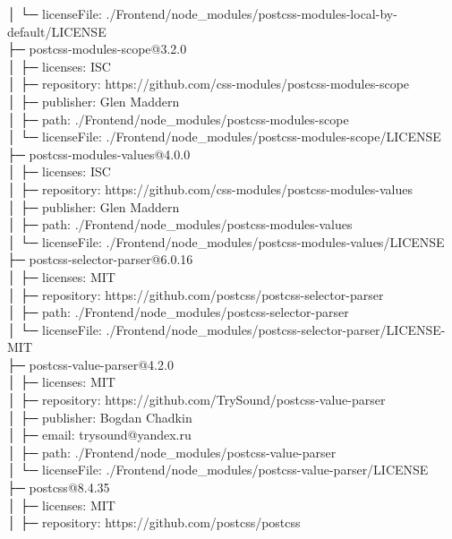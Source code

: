 \documentclass[
    paper=a4,
    twoside=false,
    parskip=half,
    listof=entryprefix,
    listof=totoc,
    index=totoc,
    bibliography=totoc,
    headsepline,
]{scrbook}
\begin{document}
    │  └─ licenseFile: ./Frontend/node\_modules/postcss-modules-local-by-default/LICENSE\\
    ├─ postcss-modules-scope@3.2.0\\
    │  ├─ licenses: ISC\\
    │  ├─ repository: https://github.com/css-modules/postcss-modules-scope\\
    │  ├─ publisher: Glen Maddern\\
    │  ├─ path: ./Frontend/node\_modules/postcss-modules-scope\\
    │  └─ licenseFile: ./Frontend/node\_modules/postcss-modules-scope/LICENSE\\
    ├─ postcss-modules-values@4.0.0\\
    │  ├─ licenses: ISC\\
    │  ├─ repository: https://github.com/css-modules/postcss-modules-values\\
    │  ├─ publisher: Glen Maddern\\
    │  ├─ path: ./Frontend/node\_modules/postcss-modules-values\\
    │  └─ licenseFile: ./Frontend/node\_modules/postcss-modules-values/LICENSE\\
    ├─ postcss-selector-parser@6.0.16\\
    │  ├─ licenses: MIT\\
    │  ├─ repository: https://github.com/postcss/postcss-selector-parser\\
    │  ├─ path: ./Frontend/node\_modules/postcss-selector-parser\\
    │  └─ licenseFile: ./Frontend/node\_modules/postcss-selector-parser/LICENSE-MIT\\
    ├─ postcss-value-parser@4.2.0\\
    │  ├─ licenses: MIT\\
    │  ├─ repository: https://github.com/TrySound/postcss-value-parser\\
    │  ├─ publisher: Bogdan Chadkin\\
    │  ├─ email: trysound@yandex.ru\\
    │  ├─ path: ./Frontend/node\_modules/postcss-value-parser\\
    │  └─ licenseFile: ./Frontend/node\_modules/postcss-value-parser/LICENSE\\
    ├─ postcss@8.4.35\\
    │  ├─ licenses: MIT\\
    │  ├─ repository: https://github.com/postcss/postcss\\
\end{document}
